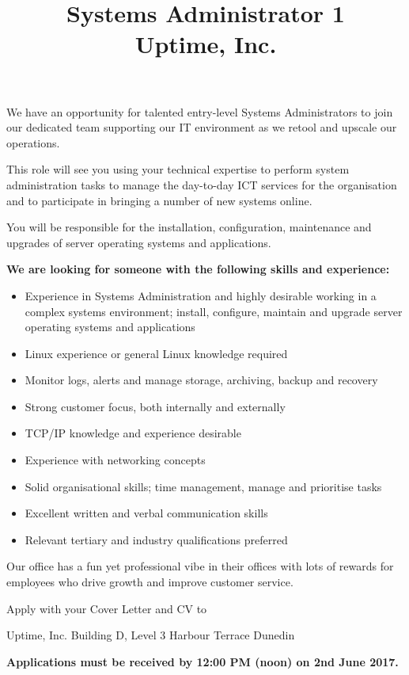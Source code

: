 \documentclass{article}   	%
\title{Systems Administrator 1\\Uptime, Inc.}
\date{}
\begin{document}
\maketitle
We have an opportunity for talented entry-level Systems Administrators to join our dedicated team supporting our IT environment as we retool and upscale our operations.
 
This role will see you using your technical expertise to perform system administration tasks to manage the day-to-day ICT services for the organisation and to participate in bringing a number of new systems online.
 
You will be responsible for the installation, configuration, maintenance and upgrades of server operating systems and applications.
 

\textbf{We are looking for someone with the following skills and experience:}
\begin{itemize}
\item Experience in Systems Administration and highly desirable working in a complex systems environment; install, configure, maintain and upgrade server operating systems and applications
\item Linux experience or general Linux knowledge required
\item Monitor logs, alerts and manage storage, archiving, backup and recovery
\item Strong customer focus, both internally and externally  
\item TCP/IP knowledge and experience desirable
\item Experience with networking concepts
\item Solid organisational skills; time management, manage and prioritise tasks
\item Excellent written and verbal communication skills
\item Relevant tertiary and industry qualifications preferred
\end{itemize}

Our office has a fun yet professional vibe in their offices with lots of rewards for employees who drive growth and improve customer service.
 
Apply with your Cover Letter and CV to


Uptime, Inc.
Building D, Level 3
Harbour Terrace
Dunedin

\textbf{Applications must be received by 12:00 PM (noon) on 2nd June 2017.}
\end{document}

